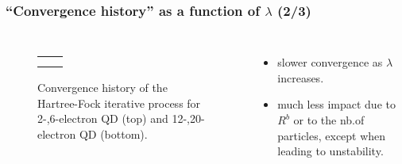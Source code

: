 \documentclass[xcolor=pdftex,hyperref={pdfpagelabels=false},table]{beamer}
\begin{document}
\begin{frame}
\frametitle{``Convergence history'' as a function of $\lambda$ (2/3)}
\begin{scriptsize}

\begin{columns}[T,l]
\column{7.5cm}
\begin{figure}
	\begin{flushleft}
\begin{tabular}{cc}
	\scalebox{0.25}{} & 	\scalebox{0.25}{}  \\
	\scalebox{0.25}{}  & 	\scalebox{0.25}{}  \\
\end{tabular}
	\end{flushleft}
	\vspace{-5pt}
	\caption{Convergence history of the Hartree-Fock iterative process  for 2-,6-electron QD (top) and 12-,20-electron QD (bottom).}
\end{figure}
\column{3.5cm}
\begin{itemize}
 \item slower convergence as $\lambda$ increases.
\item much less impact due to $R^b$ or to the nb.of particles, except when leading to unstability.
\end{itemize}
\end{columns}
\end{scriptsize}
\end{frame}
\end{document}

